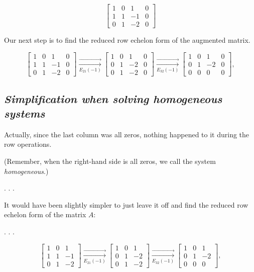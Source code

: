 \documentclass[
  letterpaper,
  DIV=11,
  numbers=noendperiod]{scrartcl}
\begin{document}
\subsection{\texorpdfstring{\emph{}}{}}\label{section-1}

\[
\left[\begin{array}{rrr|r}
1 & 0 & 1 & 0 \\
1 & 1 & -1 & 0 \\
0 & 1 & -2 & 0
\end{array}\right]
\]

Our next step is to find the reduced row echelon form of the augmented
matrix.

\[
\left[\begin{array}{rrr|r}
1 & 0 & 1 & 0 \\
1 & 1 & -1 & 0 \\
0 & 1 & -2 & 0
\end{array}\right] \xrightarrow[E_{21}(-1)]{\longrightarrow}\left[\begin{array}{rrr|r}
1 & 0 & 1 & 0 \\
0 & 1 & -2 & 0 \\
0 & 1 & -2 & 0
\end{array}\right] \xrightarrow[E_{32}(-1)]{\longrightarrow}\left[\begin{array}{rrr|r}
1 & 0 & 1 & 0 \\
0 & 1 & -2 & 0 \\
0 & 0 & 0 & 0
\end{array}\right],
\]

\subsection{\texorpdfstring{\emph{Simplification when solving
homogeneous
systems}}{Simplification when solving homogeneous systems}}\label{simplification-when-solving-homogeneous-systems}

Actually, since the last column was all zeros, nothing happened to it
during the row operations.

(Remember, when the right-hand side is all zeros, we call the system
\emph{homogeneous}.)

. . .

It would have been slightly simpler to just leave it off and find the
reduced row echelon form of the matrix \(A\):

. . .

\[
\left[\begin{array}{rrr}
1 & 0 & 1 \\
1 & 1 & -1 \\
0 & 1 & -2
\end{array}\right] \xrightarrow[E_{21}(-1)]{\longrightarrow}\left[\begin{array}{rrr}
1 & 0 & 1 \\
0 & 1 & -2 \\
0 & 1 & -2
\end{array}\right] \xrightarrow[E_{32}(-1)]{\longrightarrow}\left[\begin{array}{rrr}
1 & 0 & 1 \\
0 & 1 & -2 \\
0 & 0 & 0
\end{array}\right],
\]
\end{document}
